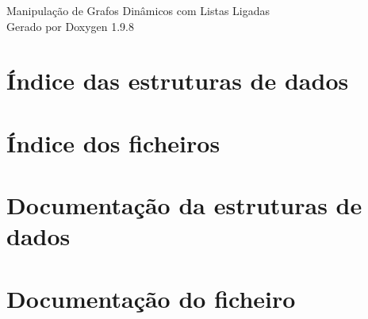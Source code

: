 \documentclass[twoside]{book}
\newcommand{\+}{\discretionary{\mbox{\scriptsize$\hookleftarrow$}}{}{}}
\newcommand{\clearemptydoublepage}{%
    \newpage{\pagestyle{empty}\cleardoublepage}%
  }
\begin{document}
  \raggedbottom
    \hypersetup{pageanchor=false,
                bookmarksnumbered=true,
                pdfencoding=unicode
               }
  \begin{titlepage}
  \vspace*{7cm}
  \begin{center}%
  {\Large Manipulação de Grafos Dinâmicos com Listas Ligadas}\\
  \vspace*{1cm}
  {\large Gerado por Doxygen 1.9.8}\\
  \end{center}
  \end{titlepage}
  \clearemptydoublepage
  \tableofcontents
  \clearemptydoublepage
  \hypersetup{pageanchor=true}
\chapter{Índice das estruturas de dados}

\chapter{Índice dos ficheiros}

\chapter{Documentação da estruturas de dados}




\chapter{Documentação do ficheiro}











  \backmatter
  \newpage
  \clearemptydoublepage
  \printindex
\end{document}
